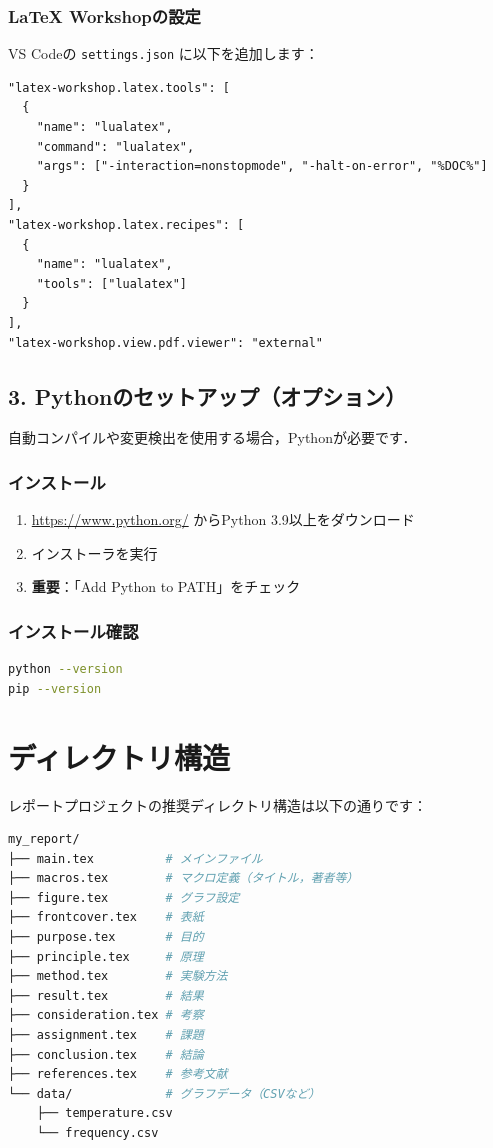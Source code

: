 \documentclass[11pt]{ltjarticle}
\begin{document}
\subsubsection{LaTeX Workshopの設定}

VS Codeの \texttt{settings.json} に以下を追加します：

\begin{lstlisting}[basicstyle=\ttfamily\tiny]
"latex-workshop.latex.tools": [
  {
    "name": "lualatex",
    "command": "lualatex",
    "args": ["-interaction=nonstopmode", "-halt-on-error", "%DOC%"]
  }
],
"latex-workshop.latex.recipes": [
  {
    "name": "lualatex",
    "tools": ["lualatex"]
  }
],
"latex-workshop.view.pdf.viewer": "external"
\end{lstlisting}

\subsection{3. Pythonのセットアップ（オプション）}

自動コンパイルや変更検出を使用する場合，Pythonが必要です．

\subsubsection{インストール}

\begin{enumerate}
  \item \url{https://www.python.org/} からPython 3.9以上をダウンロード
  \item インストーラを実行
  \item \textbf{重要}：「Add Python to PATH」をチェック
\end{enumerate}

\subsubsection{インストール確認}

\begin{lstlisting}[language=bash]
python --version
pip --version
\end{lstlisting}

\section{ディレクトリ構造}

レポートプロジェクトの推奨ディレクトリ構造は以下の通りです：

\begin{lstlisting}[language=bash]
my_report/
├── main.tex          # メインファイル
├── macros.tex        # マクロ定義（タイトル，著者等）
├── figure.tex        # グラフ設定
├── frontcover.tex    # 表紙
├── purpose.tex       # 目的
├── principle.tex     # 原理
├── method.tex        # 実験方法
├── result.tex        # 結果
├── consideration.tex # 考察
├── assignment.tex    # 課題
├── conclusion.tex    # 結論
├── references.tex    # 参考文献
└── data/             # グラフデータ（CSVなど）
    ├── temperature.csv
    └── frequency.csv
\end{lstlisting}
\end{document}
